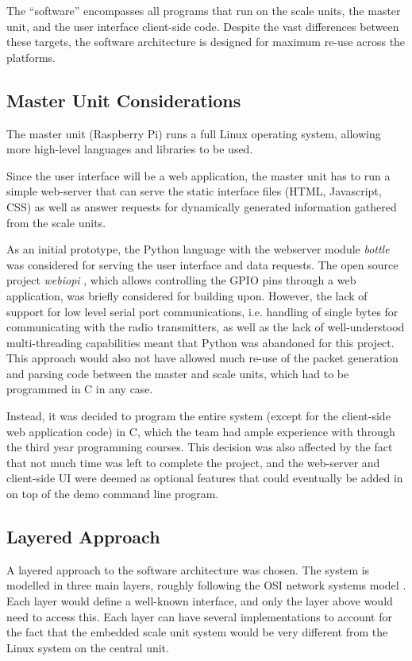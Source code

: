 The ``software'' encompasses all programs that run on the scale units, the master unit, and the user interface client-side code. Despite the vast differences between these targets, the software architecture is designed for maximum re-use across the platforms.

\subsection{Master Unit Considerations}
The master unit (Raspberry Pi) runs a full Linux operating system, allowing more high-level languages and libraries to be used.

Since the user interface will be a web application, the master unit has to run a simple web-server that can serve the static interface files (HTML, Javascript, CSS) as well as answer requests for dynamically generated information gathered from the scale units.

As an initial prototype, the Python language with the webserver module \emph{bottle} \cite{bottle-py} was considered for serving the user interface and data requests. The open source project \emph{webiopi} \cite{webiopi}, which allows controlling the GPIO pins through a web application, was briefly considered for building upon. However, the lack of support for low level serial port communications, i.e. handling of single bytes for communicating with the radio transmitters, as well as the lack of well-understood multi-threading capabilities meant that Python was abandoned for this project. This approach would also not have allowed much re-use of the packet generation and parsing code between the master and scale units, which had to be programmed in C in any case.

Instead, it was decided to program the entire system (except for the client-side web application code) in C, which the team had ample experience with through the third year programming courses. This decision was also affected by the fact that not much time was left to complete the project, and the web-server and client-side UI were deemed as optional features that could eventually be added in on top of the demo command line program.

\subsection{Layered Approach}
A layered approach to the software architecture was chosen. The system is modelled in three main layers, roughly following the OSI network systems model \cite{osi-model}. Each layer would define a well-known interface, and only the layer above would need to access this. Each layer can have several implementations to account for the fact that the embedded scale unit system would be very different from the Linux system on the central unit.


